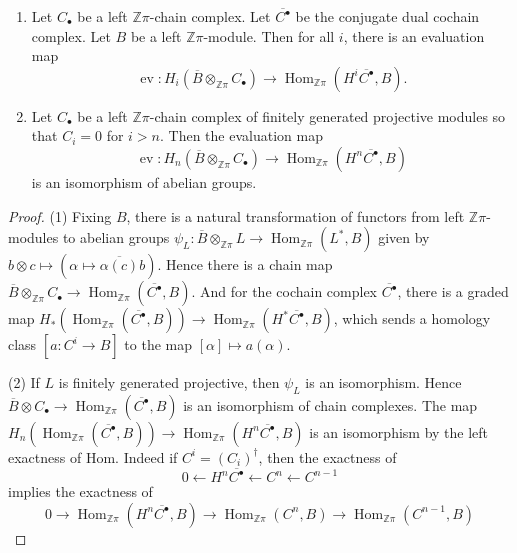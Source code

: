 \documentclass[10pt,a4paper]{amsart}
\DeclareMathOperator{\Hom}{Hom}
\DeclareMathOperator{\ev}{ev}
\newcommand{\Z}{\mathbb Z}
\newcommand{\ol}[1]{{\overline{#1}}}
\begin{document}
\begin{lemma} \label{evaluation lemma}
\begin{enumerate}

\item Let $C_\bullet$ be a left $\Z\pi$-chain complex.  Let $\ol{C^\bullet}$ be the conjugate dual cochain complex.   Let $B$ be a left $\Z\pi$-module.   Then for all $i$,  there is an evaluation map 
$$
\ev: H_i(\ol B \otimes_{\Z\pi}  C_\bullet)  \to \Hom_{\Z\pi}(H^i\ol{C^\bullet},B ).
$$

\item Let $C_\bullet$ be a left $\Z\pi$-chain complex of finitely generated projective modules so that $C_i = 0$ for $i > n$.   Then the evaluation map 
$$
\ev: H_n(\ol B \otimes_{\Z\pi}  C_\bullet)  \to \Hom_{\Z\pi}(H^n\ol{C^\bullet},B )
$$
 is an isomorphism of abelian groups.
\end{enumerate}
\end{lemma}

\begin{proof}
(1) Fixing $B$, there is a natural transformation of functors from left $\Z\pi$-modules to abelian groups $\psi_L : \ol B \otimes_{\Z\pi} L\to \Hom_{\Z\pi}(L^*,B )$ given by $b \otimes c  \mapsto (\alpha \mapsto \ol {\alpha(c)}b)$.  
%
Hence there is a chain map $\ol B \otimes_{\Z\pi} C_\bullet \to \Hom_{\Z\pi}(\ol{C^\bullet}, B)$.  And for the cochain complex $\ol{C^{\bullet}}$, there is a graded map $H_*(\Hom_{\Z\pi}(\ol{C^\bullet}, B)) \to \Hom_{\Z\pi}(H^*\ol{C^\bullet},B)$, which sends a homology class $[a: C^i \to B]$ to the map $[\alpha] \mapsto a(\alpha)$.

(2) If $L$ is finitely generated projective, then $\psi_L$ is an isomorphism.  Hence $\ol B \otimes C_\bullet \to \Hom_{\Z\pi}(\ol{C^\bullet}, B)$ is an isomorphism of chain complexes.  The map  $H_n( \Hom_{\Z\pi}(\ol{C^\bullet}, B))  \to \Hom_{\Z\pi}(H^n\ol{C^\bullet},B )$ is an isomorphism by the left exactness of Hom. Indeed if $C^{i} = (C_{i})^{\dagger}$, then the exactness of 
$$
0 \leftarrow H^{n}\ol{C^{\bullet}} \leftarrow C^{n} \leftarrow C^{n-1}
$$
implies the exactness of 
$$
0 \to \Hom_{\Z\pi}( H^{n}\ol{C^{\bullet}},B) \to \Hom_{\Z\pi}( C^{n},B) \to \Hom_{\Z\pi}( C^{n-1},B)
$$
\end{proof}
\end{document}
